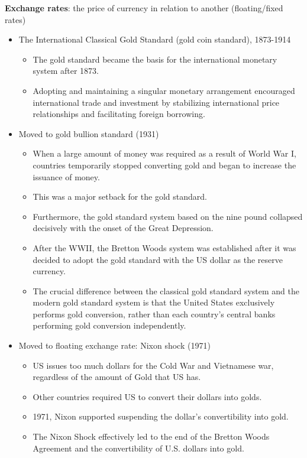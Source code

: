 \documentclass[
]{book}
\begin{document}
\textbf{Exchange rates}: the price of currency in relation to another (floating/fixed rates)

\begin{itemize}
\item
  The International Classical Gold Standard (gold coin standard), 1873-1914

  \begin{itemize}
  \item
    The gold standard became the basis for the international monetary system after 1873.
  \item
    Adopting and maintaining a singular monetary arrangement encouraged international trade and investment by stabilizing international price relationships and facilitating foreign borrowing.
  \end{itemize}
\item
  Moved to gold bullion standard (1931)

  \begin{itemize}
  \item
    When a large amount of money was required as a result of World War I, countries temporarily stopped converting gold and began to increase the issuance of money.
  \item
    This was a major setback for the gold standard.
  \item
    Furthermore, the gold standard system based on the nine pound collapsed decisively with the onset of the Great Depression.
  \item
    After the WWII, the Bretton Woods system was established after it was decided to adopt the gold standard with the US dollar as the reserve currency.
  \item
    The crucial difference between the classical gold standard system and the modern gold standard system is that the United States exclusively performs gold conversion, rather than each country's central banks performing gold conversion independently.
  \end{itemize}
\item
  Moved to floating exchange rate: Nixon shock (1971)

  \begin{itemize}
  \item
    US issues too much dollars for the Cold War and Vietnamese war, regardless of the amount of Gold that US has.
  \item
    Other countries required US to convert their dollars into golds.
  \item
    1971, Nixon supported suspending the dollar's convertibility into gold.
  \item
    The Nixon Shock effectively led to the end of the Bretton Woods Agreement and the convertibility of U.S. dollars into gold.
  \end{itemize}
\end{itemize}
\end{document}
